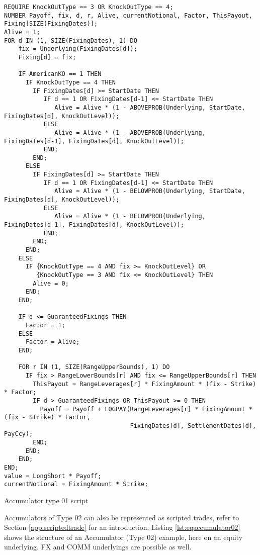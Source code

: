 \begin{listing}[H]
\begin{verbatim}
REQUIRE KnockOutType == 3 OR KnockOutType == 4;
NUMBER Payoff, fix, d, r, Alive, currentNotional, Factor, ThisPayout, Fixing[SIZE(FixingDates)];
Alive = 1;
FOR d IN (1, SIZE(FixingDates), 1) DO
    fix = Underlying(FixingDates[d]);
    Fixing[d] = fix;

    IF AmericanKO == 1 THEN
      IF KnockOutType == 4 THEN
        IF FixingDates[d] >= StartDate THEN
           IF d == 1 OR FixingDates[d-1] <= StartDate THEN
              Alive = Alive * (1 - ABOVEPROB(Underlying, StartDate, FixingDates[d], KnockOutLevel));
           ELSE
              Alive = Alive * (1 - ABOVEPROB(Underlying, FixingDates[d-1], FixingDates[d], KnockOutLevel));
           END;
        END;
      ELSE
        IF FixingDates[d] >= StartDate THEN
           IF d == 1 OR FixingDates[d-1] <= StartDate THEN
              Alive = Alive * (1 - BELOWPROB(Underlying, StartDate, FixingDates[d], KnockOutLevel));
           ELSE
              Alive = Alive * (1 - BELOWPROB(Underlying, FixingDates[d-1], FixingDates[d], KnockOutLevel));
           END;
        END;
      END;
    ELSE
      IF {KnockOutType == 4 AND fix >= KnockOutLevel} OR
         {KnockOutType == 3 AND fix <= KnockOutLevel} THEN
        Alive = 0;
      END;
    END;

    IF d <= GuaranteedFixings THEN
      Factor = 1;
    ELSE
      Factor = Alive;
    END;

    FOR r IN (1, SIZE(RangeUpperBounds), 1) DO
      IF fix > RangeLowerBounds[r] AND fix <= RangeUpperBounds[r] THEN
        ThisPayout = RangeLeverages[r] * FixingAmount * (fix - Strike) * Factor;
        IF d > GuaranteedFixings OR ThisPayout >= 0 THEN
          Payoff = Payoff + LOGPAY(RangeLeverages[r] * FixingAmount * (fix - Strike) * Factor,
                                   FixingDates[d], SettlementDates[d], PayCcy);
        END;
      END;
    END;
END;
value = LongShort * Payoff;
currentNotional = FixingAmount * Strike;
\end{verbatim}
\caption{Accumulator type 01 script}
\label{lst:accumulator01_script}
\end{listing}


Accumulators of Type 02 can also be represented as scripted trades, refer to Section \ref{app:scriptedtrade} for an
introduction.  Listing \ref{lst:eqaccumulator02} shows the structure of an Accumulator (Type 02) example, here on an
equity underlying. FX and COMM underlyings are possible as well.

